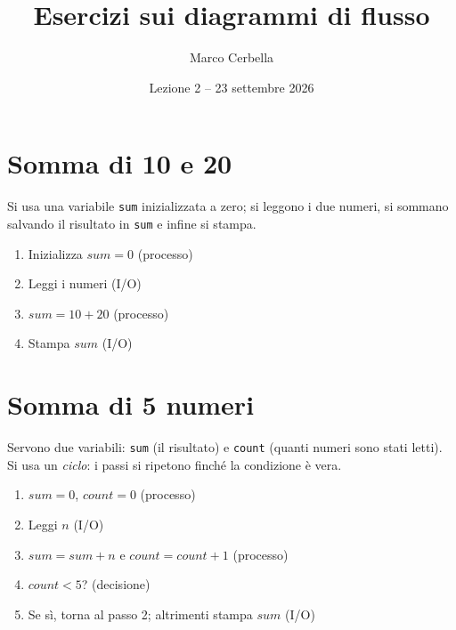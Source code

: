 \documentclass[11pt,a4paper]{article}
\title{Esercizi sui diagrammi di flusso}
\author{Marco Cerbella}
\date{Lezione 2 -- 23 settembre 2026}
\begin{document}
\maketitle

\section{Somma di 10 e 20}

Si usa una variabile \texttt{sum} inizializzata a zero; si leggono i due numeri,
si sommano salvando il risultato in \texttt{sum} e infine si stampa.

\begin{enumerate}
    \item Inizializza $sum = 0$ (processo)
    \item Leggi i numeri (I/O)
    \item $sum = 10 + 20$ (processo)
    \item Stampa $sum$ (I/O)
\end{enumerate}

\begin{center}
\end{center}

\section{Somma di 5 numeri}

Servono due variabili: \texttt{sum} (il risultato) e \texttt{count} (quanti
numeri sono stati letti). Si usa un \emph{ciclo}: i passi si ripetono finché la
condizione è vera.

\begin{enumerate}
    \item $sum = 0$, $count = 0$ (processo)
    \item Leggi $n$ (I/O)
    \item $sum = sum + n$ e $count = count + 1$ (processo)
    \item $count < 5$? (decisione)
    \item Se sì, torna al passo 2; altrimenti stampa $sum$ (I/O)
\end{enumerate}
\end{document}
